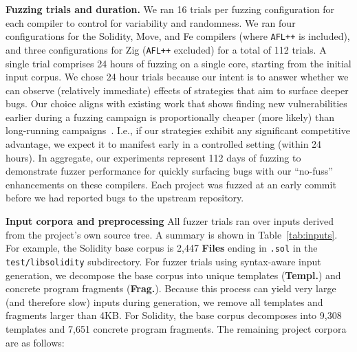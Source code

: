 \noindent \textbf{Fuzzing trials and duration.} We ran 16 trials per fuzzing
configuration for each compiler to control for variability and randomness.  We
ran four configurations for the Solidity, Move, and Fe compilers (where
\texttt{AFL++} is included), and three configurations for Zig (\texttt{AFL++}
excluded) for a total of 112 trials.  A single trial comprises 24 hours of
fuzzing on a single core, starting from the initial input corpus.  
We chose 24 hour trials because our intent is to
answer whether we can observe (relatively immediate) effects of strategies that
aim to surface deeper bugs.  Our choice aligns with existing work that shows
finding new vulnerabilities earlier during a fuzzing campaign is proportionally
cheaper (more likely) than long-running campaigns~\cite{fuzzexp}. I.e., if our
strategies exhibit any significant competitive advantage, we expect it
to manifest
early in a controlled setting (within 24 hours).  In aggregate, our
experiments represent 112 days of fuzzing to demonstrate fuzzer performance for
quickly surfacing bugs with our ``no-fuss'' enhancements on these compilers.
Each project was fuzzed at an early commit before we had reported bugs to the
upstream repository.

\noindent 
\textbf{Input corpora and preprocessing} All fuzzer trials ran over inputs derived from the
project's own source tree. A summary is shown in Table~\ref{tab:inputs}. For
example, the Solidity base corpus is 2,447 \textbf{Files} ending in
\texttt{.sol} in the \texttt{test/libsolidity} subdirectory.  For fuzzer trials
using syntax-aware input generation, we decompose the base corpus into unique
templates (\textbf{Templ.}) and concrete program fragments (\textbf{Frag.}).
Because this process can yield very large (and therefore slow) inputs during
generation, we remove all templates and fragments larger than 4KB.  For
Solidity, the base corpus decomposes into 9,308 templates and 7,651 concrete
program fragments.  The remaining project corpora are as follows:

